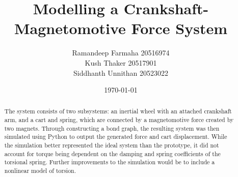 \documentclass[notitlepage,10pt]{report}
\title{Modelling a Crankshaft-Magnetomotive Force System}
\author{Ramandeep Farmaha 20516974\\ Kush Thaker 20517901\\ Siddhanth Unnithan 20523022}
\date{\today}
\begin{document}
\maketitle
\begin{abstract}
\normalsize
The system consists of two subsystems: an inertial wheel with an attached crankshaft arm, and a cart and spring, which are connected by a magnetomotive force created by two magnets. Through constructing a bond graph, the resulting system was then simulated using Python to output the generated force and cart displacement. While the simulation better represented the ideal system than the prototype, it did not account for torque being dependent on the damping and spring coefficients of the torsional spring. Further improvements to the simulation would be to include a nonlinear model of torsion.
\end{abstract}
\end{document}
